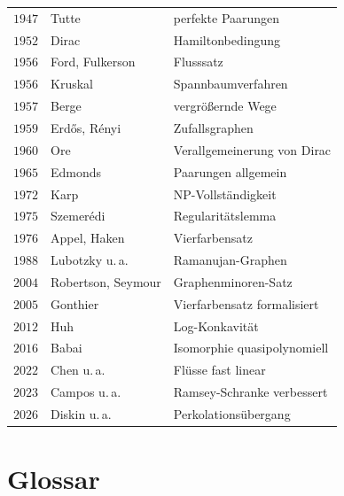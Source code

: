\begin{merksatz}
\begin{center}
{\begin{tabular}{@{}P{1.4cm}P{2.8cm}P{4.0cm}@{}}
$1947$ & Tutte & perfekte Paarungen\\
$1952$ & Dirac & Hamiltonbedingung\\
$1956$ & Ford, Fulkerson & Flusssatz\\
$1956$ & Kruskal & Spannbaumverfahren\\
$1957$ & Berge & vergrößernde Wege\\
$1959$ & Erdős, Rényi & Zufallsgraphen\\
$1960$ & Ore & Verallgemeinerung von Dirac\\
$1965$ & Edmonds & Paarungen allgemein\\
$1972$ & Karp & NP-Vollständigkeit\\
$1975$ & Szemerédi & Regularitätslemma\\
$1976$ & Appel, Haken & Vierfarbensatz\\
$1988$ & Lubotzky u.\,a. & Ramanujan-Graphen\\
$2004$ & Robertson, Seymour & Graphenminoren-Satz\\
$2005$ & Gonthier & Vierfarbensatz formalisiert\\
$2012$ & Huh & Log-Konkavität\\
$2016$ & Babai & Isomorphie quasipolynomiell\\
$2022$ & Chen u.\,a. & Flüsse fast linear\\
$2023$ & Campos u.\,a. & Ramsey-Schranke verbessert\\
$2026$ & Diskin u.\,a. & Perkolationsübergang\\
\bottomrule
\end{tabular}}
\end{center}
\end{merksatz}

\section{Glossar}

